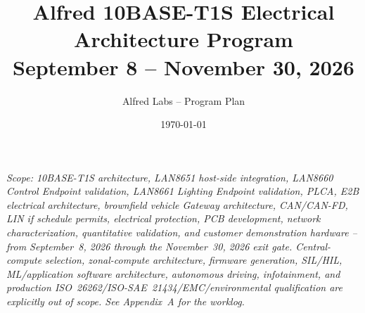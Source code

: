 \documentclass[11pt]{article}
\title{\vspace{-2cm}\textcolor{alfrednavy}{\Huge\bfseries Alfred 10BASE-T1S Electrical Architecture Program}\\[0.6em]
\large\textcolor{alfredsteel}{September 8 -- November 30, 2026}}
\author{Alfred Labs -- Program Plan}
\date{\today}
\begin{document}
\maketitle
\thispagestyle{empty}

\begin{center}
\begin{minipage}{0.85\linewidth}
\small
\textit{Scope: 10BASE-T1S architecture, LAN8651 host-side integration, LAN8660 Control Endpoint validation, LAN8661 Lighting Endpoint validation, PLCA, E2B electrical architecture, brownfield vehicle Gateway architecture, CAN/CAN-FD, LIN if schedule permits, electrical protection, PCB development, network characterization, quantitative validation, and customer demonstration hardware -- from September~8, 2026 through the November~30, 2026 exit gate. Central-compute selection, zonal-compute architecture, firmware generation, SIL/HIL, ML/application software architecture, autonomous driving, infotainment, and production ISO~26262/ISO-SAE~21434/EMC/environmental qualification are explicitly out of scope. See Appendix~A for the worklog.}
\end{minipage}
\end{center}
\newpage

\tableofcontents
\newpage

























\end{document}
